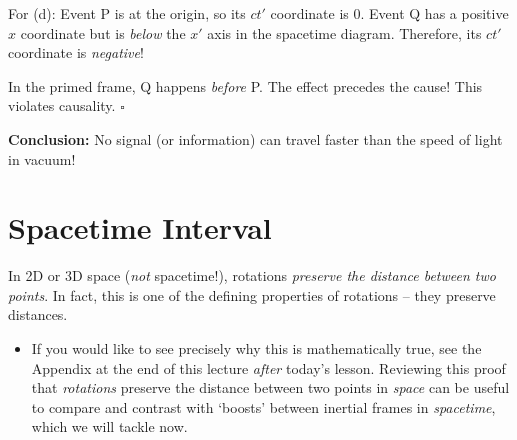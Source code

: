 \documentclass[11pt, letterpaper, openany]{book}
\newenvironment{solution}[1][Solution]{%
  \tcolorbox[blanker, breakable, left=1em,
    before skip=1em, after skip=1em,
    borderline west={2pt}{0pt}{PhysTeal},
    colback=PhysCream,
    before upper={\textcolor{PhysTeal}{\sffamily\bfseries #1.}\space}
  ]%
}{%
  \hfill\textcolor{PhysTeal}{\ensuremath{\square}}\endtcolorbox%
}
\begin{document}
\begin{center}
\end{center}

\begin{solution}
For (d): Event P is at the origin, so its $ct'$ coordinate is $0$.
Event Q has a positive $x$ coordinate but is \textit{below} the $x'$ axis in the spacetime diagram. Therefore, its $ct'$ coordinate is \textit{negative}! 

In the primed frame, Q happens \textit{before} P. The effect precedes the cause! This violates causality.
\end{solution}

\textbf{Conclusion:} No signal (or information) can travel faster than the speed of light in vacuum!

\section{Spacetime Interval}

In 2D or 3D space (\textit{not} spacetime!), rotations \textit{preserve the distance between two points}. In fact, this is one of the defining properties of rotations -- they preserve distances.
\begin{itemize}
    \item If you would like to see precisely why this is mathematically true, see the Appendix at the end of this lecture \textit{after} today's lesson. Reviewing this proof that \textit{rotations} preserve the distance between two points in \textit{space} can be useful to compare and contrast with `boosts' between inertial frames in \textit{spacetime}, which we will tackle now.
\end{itemize}
\end{document}
